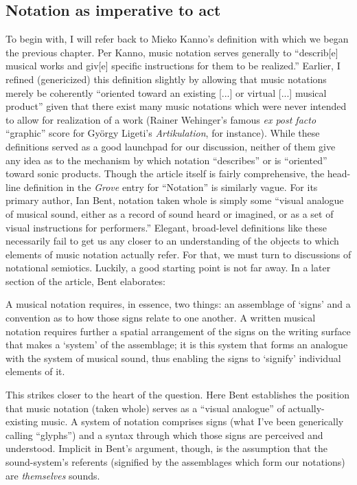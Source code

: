     \subsection{Notation as imperative to act}
    
    To begin with, I will refer back to Mieko Kanno's definition with which we began the previous chapter. Per Kanno, music notation serves generally to ``describ[e] musical works and giv[e] specific instructions for them to be realized.'' Earlier, I refined (genericized) this definition slightly by allowing that music notations merely be coherently ``oriented toward an existing [...] or virtual [...] musical product'' given that there exist many music notations which were never intended to allow for realization of a work (Rainer Wehinger's famous \textit{ex post facto} ``graphic'' score for György Ligeti's \textit{Artikulation}, for instance). While these definitions served as a good launchpad for our discussion, neither of them give any idea as to the mechanism by which notation ``describes'' or is ``oriented'' toward sonic products. Though the article itself is fairly comprehensive, the head-line definition in the \textit{Grove} entry for ``Notation'' is similarly vague. For its primary author, Ian Bent, notation taken whole is simply some ``visual analogue of musical sound, either as a record of sound heard or imagined, or as a set of visual instructions for performers.''\autocite{Bent_2014} Elegant, broad-level definitions like these necessarily fail to get us any closer to an understanding of the objects to which elements of music notation actually refer. For that, we must turn to discussions of notational semiotics. Luckily, a good starting point is not far away. In a later section of the article, Bent elaborates:

        \begin{smallquote}
            A musical notation requires, in essence, two things: an assemblage of ‘signs’ and a convention as to how those signs relate to one another. A written musical notation requires further a spatial arrangement of the signs on the writing surface that makes a ‘system’ of the assemblage; it is this system that forms an analogue with the system of musical sound, thus enabling the signs to ‘signify’ individual elements of it.\autocite[Section II.1]{Bent_2014}
        \end{smallquote}

    This strikes closer to the heart of the question. Here Bent establishes the position that music notation (taken whole) serves as a ``visual analogue'' of actually-existing music. A system of notation comprises signs (what I've been generically calling ``glyphs'') and a syntax through which those signs are perceived and understood. Implicit in Bent's argument, though, is the assumption that the sound-system's referents (signified by the assemblages which form our notations) are \textit{themselves} sounds. 
    
